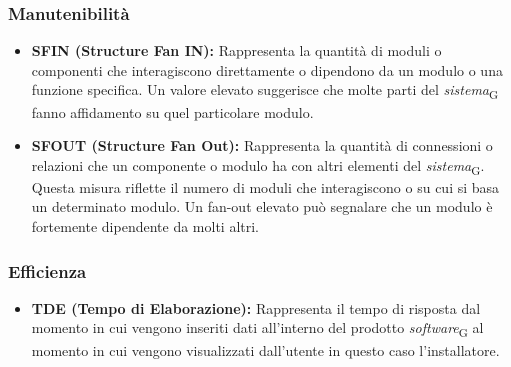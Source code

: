 \subsubsection{Manutenibilità}
\begin{itemize}
    \item \textbf{SFIN (Structure Fan IN):} Rappresenta la quantità di moduli o componenti che interagiscono direttamente o dipendono da un modulo o una funzione specifica. Un valore elevato suggerisce che molte parti del \textit{sistema}\textsubscript{G} fanno affidamento su quel particolare modulo.
    \item \textbf{SFOUT (Structure Fan Out):} Rappresenta la quantità di connessioni o relazioni che un componente o modulo ha con altri elementi del \textit{sistema}\textsubscript{G}. Questa misura riflette il numero di moduli che interagiscono o su cui si basa un determinato modulo. Un fan-out elevato può segnalare che un modulo è fortemente dipendente da molti altri.
\end{itemize}
\subsubsection{Efficienza}
\begin{itemize}
    \item \textbf{TDE (Tempo di Elaborazione):} Rappresenta il tempo di risposta dal momento in cui vengono inseriti dati all'interno del prodotto \textit{software}\textsubscript{G} al momento in cui vengono visualizzati dall'utente in questo caso l'installatore.
\end{itemize}